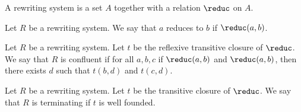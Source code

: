 \begin{theory}
   A rewriting system is a set $A$
   together with a relation $\reduc$ on $A$.
\end{theory}


\begin{definition}
   Let $R$ be a rewriting system.
   We say that $a$ reduces to $b$ if $\reduc(a, b)$.
\end{definition}


\begin{definition}
   Let $R$ be a rewriting system.
   Let $t$ be the reflexive transitive closure of $\reduc$.
   We say that $R$ is confluent if
   for all $a, b, c$ if $\reduc(a, b)$ and $\reduc(a, b)$,
   then there exists $d$ such that
   $t(b, d)$ and $t(c, d)$.
\end{definition}


\begin{definition}
   Let $R$ be a rewriting system.
   Let $t$ be the transitive closure of $\reduc$.
   We say that $R$ is terminating if $t$ is well founded.
\end{definition}
